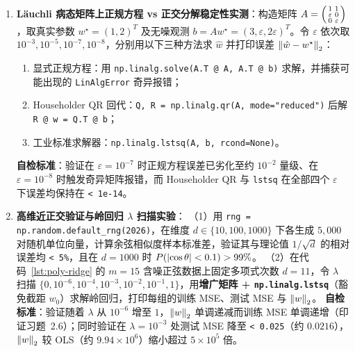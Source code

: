 \begin{enumerate}[label=\textbf{2.\arabic*}, resume]
  \item \textbf{Läuchli 病态矩阵上正规方程 vs 正交分解稳定性实测}：构造矩阵 $A = \begin{psmallmatrix} 1 & 1 \\ \varepsilon & 0 \\ 0 & \varepsilon \end{psmallmatrix}$，取真实参数 $w^\star = (1, 2)^T$ 及无噪观测 $b = A w^\star = (3, \varepsilon, 2\varepsilon)^T$。令 $\varepsilon$ 依次取 $10^{-3}, 10^{-5}, 10^{-7}, 10^{-8}$，分别用以下三种方法求 $\hat{w}$ 并打印误差 $\left\|\hat{w} - w^\star\right\|_2$：
  \begin{enumerate}[label=(\alph*)]
    \item 显式正规方程：用 \texttt{np.linalg.solve(A.T @ A, A.T @ b)} 求解，并捕获可能出现的 \texttt{LinAlgError} 奇异报错；
    \item Householder QR 回代：\texttt{Q, R = np.linalg.qr(A, mode="reduced")} 后解 \texttt{R @ w = Q.T @ b}；
    \item 工业标准求解器：\texttt{np.linalg.lstsq(A, b, rcond=None)}。
  \end{enumerate}
  \textbf{自检标准}：验证在 $\varepsilon = 10^{-7}$ 时正规方程误差已劣化至约 $10^{-2}$ 量级、在 $\varepsilon = 10^{-8}$ 时触发奇异矩阵报错，而 Householder QR 与 \texttt{lstsq} 在全部四个 $\varepsilon$ 下误差均保持在 \texttt{< 1e-14}。

  \item \textbf{高维近正交验证与岭回归 $\lambda$ 扫描实验}：
  （1）用 \texttt{rng = np.random.default\_rng(2026)}，在维度 $d \in \{10, 100, 1000\}$ 下各生成 $5{,}000$ 对随机单位向量，计算余弦相似度样本标准差，验证其与理论值 $1/\sqrt{d}$ 的相对误差均 \texttt{< 5\%}，且在 $d = 1000$ 时 $P(\left|\cos\theta\right| < 0.1) > 99\%$。
  （2）在代码~\ref{lst:poly-ridge} 的 $m=15$ 含噪正弦数据上固定多项式次数 $d = 11$，令 $\lambda$ 扫描 $\{0, 10^{-6}, 10^{-4}, 10^{-3}, 10^{-2}, 10^{-1}, 1\}$，用\textbf{增广矩阵 + \texttt{np.linalg.lstsq}}（豁免截距 $w_0$）求解岭回归，打印每组的训练 MSE、测试 MSE 与 $\left\|w\right\|_2$。
  \textbf{自检标准}：验证随着 $\lambda$ 从 $10^{-6}$ 增至 $1$，$\left\|w\right\|_2$ 单调递减而训练 MSE 单调递增（印证习题~2.6）；同时验证在 $\lambda = 10^{-3}$ 处测试 MSE 降至 \texttt{< 0.025}（约 $0.0216$），$\left\|w\right\|_2$ 较 OLS（约 $9.94 \times 10^6$）缩小超过 $5 \times 10^5$ 倍。
\end{enumerate}
